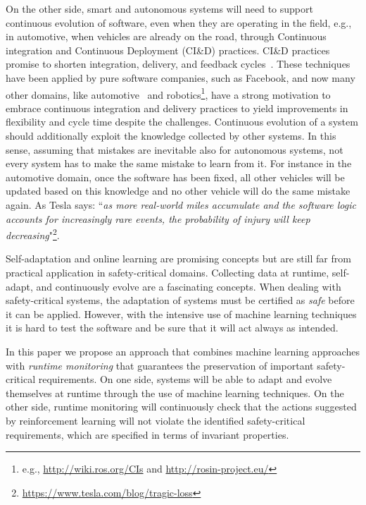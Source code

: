 \documentclass[sigconf,review, anonymous]{acmart}
\begin{document}
On the other side, smart and autonomous systems will need to support continuous evolution of software, even when they are operating in the field, e.g., in automotive, when
vehicles are already on the road, through Continuous integration and Continuous Deployment (CI\&D) practices. 
CI\&D practices promise to shorten integration, delivery,
and feedback cycles~\cite{Stahl2014}.
These techniques have been applied by pure software companies, such as Facebook, and now many other domains, like automotive~\cite{Knauss2016} and robotics\footnote{e.g., \url{http://wiki.ros.org/CIs} and \url{http://rosin-project.eu/}}, have a strong motivation
to embrace continuous integration and delivery practices to yield improvements in flexibility
and cycle time despite the challenges.
Continuous evolution of a system should additionally exploit %
the knowledge collected by other systems. In this sense, assuming that mistakes are inevitable also for autonomous systems, not every system has to make the same mistake to learn from it. For instance in the automotive domain, once the software has been fixed, all other vehicles will be updated based on this knowledge and no other vehicle will do the same mistake again. As Tesla says: ``\emph{as more real-world miles accumulate and the software logic accounts for increasingly rare events, the probability of injury will keep decreasing}"\footnote{\url{https://www.tesla.com/blog/tragic-loss}}.







Self-adaptation and online learning are promising concepts but are still far from practical application in safety-critical domains. Collecting data at runtime, self-adapt, and continuously evolve are a fascinating concepts. When dealing with safety-critical systems, the adaptation of systems must be certified as \emph{safe} before it can be applied. %
However, with the intensive use of machine learning techniques it is hard to test the software and be sure that it will act always as intended. 

In this paper we propose an approach that combines machine learning approaches with \emph{runtime monitoring} that guarantees the preservation of important safety-critical requirements. 
On one side, systems will be able to adapt and evolve themselves at runtime through the use of machine learning techniques. On the other side, runtime monitoring will continuously check that the actions suggested by reinforcement learning will not violate 
the identified safety-critical requirements, which are specified in terms of invariant properties.
\end{document}

